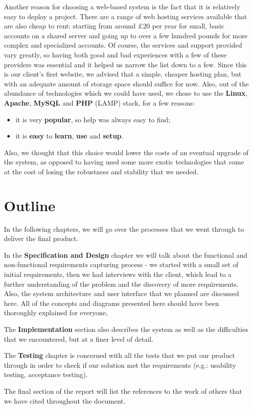 \documentclass{article}
\begin{document}
Another reason for choosing a web-based system is the fact that it is
relatively easy to deploy a project. There are a range of web hosting services
available that are also cheap to rent: starting from around £20 per year for 
small, basic accounts on a shared server and going up to over a few hundred 
pounds for more complex and specialized accounts. Of course, the services and 
support provided vary greatly, so having both good and bad experiences with 
a few of these providers was essential and it helped us narrow the list down
to a few. Since this is our client's first website, we advised that a simple,
cheaper hosting plan, but with an adequate amount of storage space should suffice
for now. Also, out of the abundance of technologies which we could have used,
we chose to use the {\bf Linux}, {\bf Apache}, {\bf MySQL} and {\bf PHP} (LAMP) stack, for a few reasons:
\begin{itemize}
	\item
	it is very {\bf popular}, so help was always easy to find;
	
	\item
	it is {\bf easy} to {\bf learn}, {\bf use} and {\bf setup}.
\end{itemize}
Also, we thought that this choice would lower the costs of an eventual upgrade
of the system, as opposed to having used some more exotic technologies that
come at the cost of losing the robustness and stability that we needed.

\section*{Outline}
In the following chapters, we will go over the processes that we went through
to deliver the final product.

In the {\bf Specification and Design} chapter we will talk about the functional and
non-functional requirements capturing process - we started with a small set of
initial requirements, then we had interviews with the client, which lead to a
further understanding of the problem and the discovery of more requirements.
Also, the system architecture and user interface that we planned are discussed
here. All of the concepts and diagrams presented here should have been thoroughly
explained for everyone, 

The {\bf Implementation} section also describes the system as well as the difficulties that we encountered, but at a finer level of detail.

The {\bf Testing} chapter is concerned with all the tests that we put our product through in order to check if our solution met the requirements (e.g.: usability testing, acceptance testing).

The final section of the report will list the references to the work of others that we have cited throughout the document.
\end{document}
